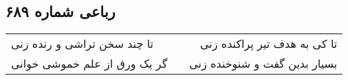 \begin{center}
\section*{رباعی شماره ۶۸۹}
\label{sec:sh689}
\begin{longtable}{l p{0.5cm} r}
تا چند سخن تراشی و رنده زنی
&&
تا کی به هدف تیر پراکنده زنی
\\
گر یک ورق از علم خموشی خوانی
&&
بسیار بدین گفت و شنوخنده زنی
\\
\end{longtable}
\end{center}
